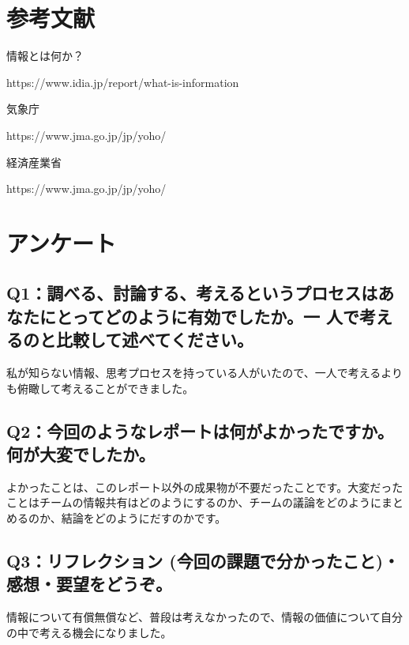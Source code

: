 \documentclass[12pt,a4j]{jarticle}
\begin{document}
\section{参考文献}

情報とは何か？

https://www.idia.jp/report/what-is-information

気象庁

https://www.jma.go.jp/jp/yoho/

経済産業省

https://www.jma.go.jp/jp/yoho/

\section{アンケート}

\subsection{Q1：調べる、討論する、考えるというプロセスはあなたにとってどのように有効でしたか。一 人で考えるのと比較して述べてください。}
私が知らない情報、思考プロセスを持っている人がいたので、一人で考えるよりも俯瞰して考えることができました。

\subsection{Q2：今回のようなレポートは何がよかったですか。何が大変でしたか。}
よかったことは、このレポート以外の成果物が不要だったことです。大変だったことはチームの情報共有はどのようにするのか、チームの議論をどのようにまとめるのか、結論をどのようにだすのかです。

\subsection{Q3：リフレクション (今回の課題で分かったこと)・感想・要望をどうぞ。}
情報について有償無償など、普段は考えなかったので、情報の価値について自分の中で考える機会になりました。
\end{document}
